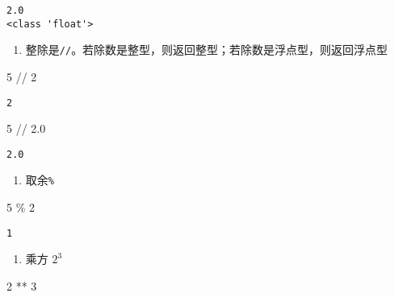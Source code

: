 \documentclass[
  letterpaper,
  DIV=11,
  numbers=noendperiod]{scrreprt}
\newenvironment{Shaded}{\begin{snugshade}}{\end{snugshade}}
\newcommand{\DecValTok}[1]{\textcolor[rgb]{0.68,0.00,0.00}{#1}}
\newcommand{\FloatTok}[1]{\textcolor[rgb]{0.68,0.00,0.00}{#1}}
\newcommand{\OperatorTok}[1]{\textcolor[rgb]{0.37,0.37,0.37}{#1}}
\providecommand{\tightlist}{%
  \setlength{\itemsep}{0pt}\setlength{\parskip}{0pt}}\usepackage{longtable,booktabs,array}
\begin{document}
\begin{verbatim}
2.0
<class 'float'>
\end{verbatim}

\begin{enumerate}
\def\labelenumi{\arabic{enumi}.}
\setcounter{enumi}{1}
\tightlist
\item
  整除是\texttt{//}。若除数是整型，则返回整型；若除数是浮点型，则返回浮点型
\end{enumerate}

\begin{Shaded}
\begin{Highlighting}[]
\DecValTok{5} \OperatorTok{//} \DecValTok{2}
\end{Highlighting}
\end{Shaded}

\begin{verbatim}
2
\end{verbatim}

\begin{Shaded}
\begin{Highlighting}[]
\DecValTok{5} \OperatorTok{//} \FloatTok{2.0}
\end{Highlighting}
\end{Shaded}

\begin{verbatim}
2.0
\end{verbatim}

\begin{enumerate}
\def\labelenumi{\arabic{enumi}.}
\setcounter{enumi}{2}
\tightlist
\item
  取余\texttt{\%}
\end{enumerate}

\begin{Shaded}
\begin{Highlighting}[]
\DecValTok{5} \OperatorTok{\%} \DecValTok{2}
\end{Highlighting}
\end{Shaded}

\begin{verbatim}
1
\end{verbatim}

\begin{enumerate}
\def\labelenumi{\arabic{enumi}.}
\setcounter{enumi}{3}
\tightlist
\item
  乘方 \(2^3\)
\end{enumerate}

\begin{Shaded}
\begin{Highlighting}[]
\DecValTok{2} \OperatorTok{**} \DecValTok{3}
\end{Highlighting}
\end{Shaded}
\end{document}
